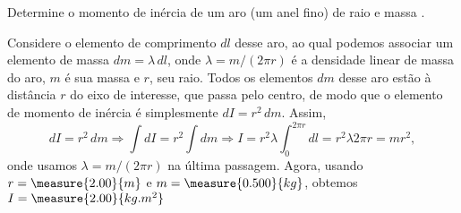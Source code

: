 \begin{question}
    Determine o momento de inércia de um aro (um anel fino) de raio  e massa .
    \begin{answer}
    \end{answer}

    \begin{solution}
      Considere o elemento de comprimento $dl$ desse aro, ao qual podemos associar um elemento de massa $dm = \lambda\, dl$, onde $\lambda = m /(2\pi r)$ é a densidade linear de massa do aro, $m$ é sua massa e $r$, seu raio.
      Todos os elementos $dm$ desse aro estão à distância $r$ do eixo de interesse, que passa pelo centro, de modo que o elemento de momento de inércia é simplesmente $dI = r^2\,dm$.
      Assim,
      \begin{equation*}
        dI = r^2\, dm
          \Rightarrow
        \int dI = r^2 \int dm
          \Rightarrow
        I = r^2 \lambda \int_0^{2\pi r} dl
          = r^2 \lambda 2 \pi r
          = m r^2,
      \end{equation*}
      onde usamos $\lambda = m /(2\pi r)$ na última passagem. Agora, usando $r = \measure{2.00}{m}$ e $m = \measure{0.500}{kg}$, obtemos $I = \measure{2.00}{kg.m^2}$
    \end{solution}
\end{question}